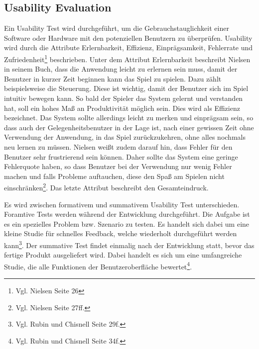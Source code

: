 		\subsection{Usability Evaluation}
			Ein Usability Test wird durchgeführt, um die Gebrauchstauglichkeit einer Software oder Hardware mit den potenziellen Benutzern zu überprüfen. Usability wird durch die Attribute Erlernbarkeit, Effizienz, Einprägsamkeit, Fehlerrate und Zufriedenheit\footnote{Vgl. Nielsen \cite{NielsenUI} Seite 26} beschrieben. Unter dem Attribut Erlernbarkeit beschreibt Nielsen in seinem Buch, dass die Anwendung leicht zu erlernen sein muss, damit der Benutzer in kurzer Zeit beginnen kann das Spiel zu spielen. Dazu zählt beispielsweise die Steuerung. Diese ist wichtig, damit der Benutzer sich im Spiel intuitiv bewegen kann. So bald der Spieler das System gelernt und verstanden hat, soll ein hohes Maß an Produktivität möglich sein. Dies wird als Effizienz bezeichnet. Das System sollte allerdings leicht zu merken und einprägsam sein, so dass auch der Gelegenheitsbenutzer in der Lage ist, nach einer gewissen Zeit ohne Verwendung der Anwendung, in das Spiel zurückzukehren, ohne alles nochmals neu lernen zu müssen. Nielsen weißt zudem darauf hin, dass Fehler für den Benutzer sehr frustrierend sein können. Daher sollte das System eine geringe Fehlerquote haben, so dass Benutzer bei der Verwendung nur wenig Fehler machen und falls Probleme auftauchen, diese den Spaß am Spielen nicht einschränken\footnote{Vgl. Nielsen \cite{NielsenUI} Seite 27ff.}. Das letzte Attribut beschreibt den Gesamteindruck.

			Es wird zwischen formativem und summativem Usability Test unterschieden. Foramtive Tests werden während der Entwicklung durchgeführt. Die Aufgabe ist es ein spezielles Problem bzw. Szenario zu testen. Es handelt sich dabei um eine kleine Studie für schnelles Feedback, welche wiederholt durchgeführt werden kann\footnote{Vgl. Rubin und Chisnell \cite{handbookUsability} Seite 29f.}. Der summative Test findet einmalig nach der Entwicklung statt, bevor das fertige Produkt ausgeliefert wird. Dabei handelt es sich um eine umfangreiche Studie, die alle Funktionen der Benutzeroberfläche bewertet\footnote{Vgl. Rubin und Chisnell \cite{handbookUsability} Seite 34f.}.

